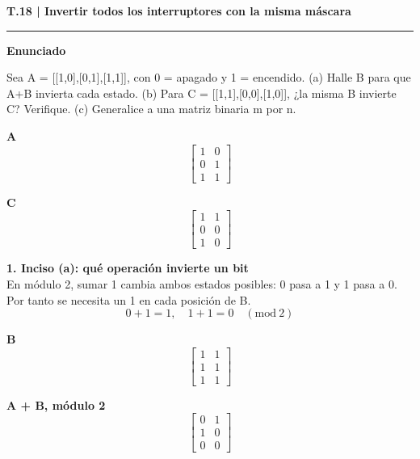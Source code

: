 \documentclass[11pt,a4paper,landscape]{article}
\newcommand{\titulo}[1]{{\LARGE\bfseries #1}\par\smallskip\hrule\medskip}
\begin{document}
\normalsize
\newpage{}\hypertarget{1.2-T.18}{}
\titulo{T.18 | Invertir todos los interruptores con la misma máscara}
\textbf{Enunciado}\par Sea A = [[1,0],[0,1],[1,1]], con 0 = apagado y 1 = encendido. (a) Halle B para que A+B invierta cada estado. (b) Para C = [[1,1],[0,0],[1,0]], ¿la misma B invierte C? Verifique. (c) Generalice a una matriz binaria m por n.
\par\smallskip \begin{minipage}[t]{.47\linewidth}\centering \textbf{A}\[\begin{bmatrix}1 & 0\\0 & 1\\1 & 1\end{bmatrix}\]\end{minipage}\hfill\begin{minipage}[t]{.47\linewidth}\centering \textbf{C}\[\begin{bmatrix}1 & 1\\0 & 0\\1 & 0\end{bmatrix}\]\end{minipage}\par\smallskip
\par\medskip\large
\noindent\begin{minipage}{\linewidth}\textbf{1. Inciso (a): qué operación invierte un bit}\\[2pt]En módulo 2, sumar 1 cambia ambos estados posibles: 0 pasa a 1 y 1 pasa a 0. Por tanto se necesita un 1 en cada posición de B.
\[0+1=1,\quad1+1=0\quad(\mathrm{mod}\ 2)\]
\par\smallskip \begin{minipage}[t]{.47\linewidth}\centering \textbf{B}\[\begin{bmatrix}1 & 1\\1 & 1\\1 & 1\end{bmatrix}\]\end{minipage}\hfill\begin{minipage}[t]{.47\linewidth}\centering \textbf{A + B, módulo 2}\[\begin{bmatrix}0 & 1\\1 & 0\\0 & 0\end{bmatrix}\]\end{minipage}\par\smallskip
\end{minipage}\par\medskip
\end{document}
